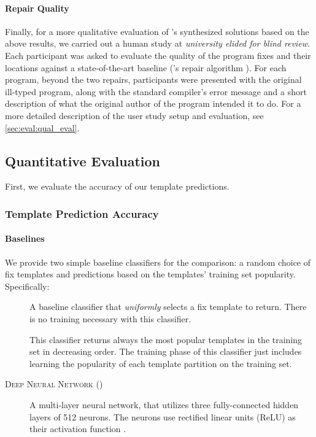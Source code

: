 \paragraph{Repair Quality}
Finally, for a more qualitative evaluation of \toolname's synthesized solutions
based on the above results, we carried out a human study at \emph{university
elided for blind review}. Each participant was asked to evaluate the quality of
the program fixes and their locations against a state-of-the-art baseline
(\seminal's repair algorithm \citep{Lerner2007-dt}). For each program, beyond the
two repairs, participants were presented with the original ill-typed program,
along with the standard \ocaml compiler's error message and a short description
of what the original author of the program intended it to do. For a more
detailed description of the user study setup and evaluation, see
\autoref{sec:eval:qual_eval}.

\subsection{Quantitative Evaluation}
\label{sec:eval:quan_eval}

First, we evaluate the accuracy of our template predictions.


\subsubsection{Template Prediction Accuracy}
\label{subsec:eval:templ_acc}

\paragraph{Baselines}
We provide two simple baseline classifiers for the comparison: a random choice
of fix templates and predictions based on the templates' training set
popularity. Specifically:
\begin{description}
  \item[\random] A baseline classifier that \emph{uniformly} selects a fix
    template to return. There is no training necessary with this classifier.
  \item[\popular] This classifier returns always the most popular templates in
    the training set in decreasing order. The training phase of this classifier
    just includes learning the popularity of each template partition on the
    training set.
  \item[\textsc{Deep Neural Network} (\dnn)] A multi-layer neural network, that
    utilizes three fully-connected hidden layers of 512 neurons. The neurons use
    rectified linear units (ReLU) as their activation function \citep{Nair2010-xg}.
\end{description}

